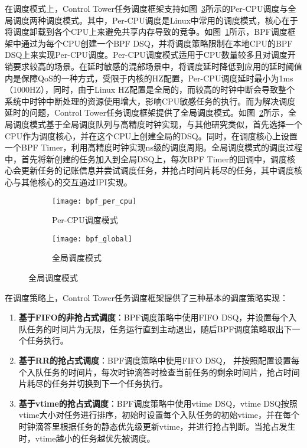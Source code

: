 在调度模式上，Control Tower任务调度框架支持如图~\ref{fig:bpf_sched_mode}所示的Per-CPU调度与全局调度两种调度模式。其中，Per-CPU调度是Linux中常用的调度模式，核心在于将调度卸载到各个CPU上来避免共享内存导致的竞争。如图~\ref{fig:bpf_per_cpu}所示，BPF调度框架中通过为每个CPU创建一个BPF DSQ，并将调度策略限制在本地CPU的BPF DSQ上来实现Per-CPU调度。Per-CPU调度模式适用于CPU数量较多且对调度开销要求较高的场景。在延时敏感的混部场景中，将调度延时降低到应用的延时阈值内是保障QoS的一种方式，受限于内核的HZ配置，Per-CPU调度延时最小为1ms（1000HZ），同时，由于Linux HZ配置是全局的，而较高的时钟中断会导致整个系统中时钟中断处理的资源使用增大，影响CPU敏感任务的执行。而为解决调度延时的问题，Control Tower任务调度框架提供了全局调度模式。如图~\ref{fig:bpf_global}所示，全局调度模式基于全局调度队列与高精度时钟实现，与其他研究类似，首先选择一个CPU作为调度核心，并在这个CPU上创建全局的DSQ。同时，在调度核心上设置一个BPF Timer，利用高精度时钟实现ns级的调度周期。全局调度模式的调度过程中，首先将新创建的任务加入到全局DSQ上，每次BPF Timer的回调中，调度核心会更新任务的记账信息并尝试调度任务，并抢占时间片耗尽的任务，其中调度核心与其他核心的交互通过IPI实现。

\begin{figure}[!htbp]
    \centering
    \begin{subfigure}[b]{0.45\textwidth}
        \texttt{[image: bpf\_per\_cpu]}
        \caption{Per-CPU调度模式}
        \label{fig:bpf_per_cpu}
    \end{subfigure}
    \hspace{0.5cm}
    \begin{subfigure}[b]{0.45\textwidth}
        \texttt{[image: bpf\_global]}
        \caption{全局调度模式}
        \label{fig:bpf_global}
    \end{subfigure}
\label{fig:bpf_sched_mode}
\end{figure}

在调度策略上，Control Tower任务调度框架提供了三种基本的调度策略实现：

\begin{enumerate}
    \item \textbf{基于FIFO的非抢占式调度}：BPF调度策略中使用FIFO DSQ，并设置每个入队任务的时间片为无限，任务运行直到主动退出，随后BPF调度策略取出下一个任务执行。
    
    \item \textbf{基于RR的抢占式调度}：BPF调度策略中使用FIFO DSQ， 并按照配置设置每个入队任务的时间片，每次时钟滴答时检查当前任务的剩余时间片，抢占时间片耗尽的任务并切换到下一个任务执行。

    \item \textbf{基于vtime的抢占式调度}：BPF调度策略中使用vtime DSQ，vtime DSQ按照vtime大小对任务进行排序，初始时设置每个入队任务的初始vtime，并在每个时钟滴答里根据任务的静态优先级更新vtime，并进行抢占判断。当抢占发生时，vtime越小的任务越优先被调度。
\end{enumerate}

